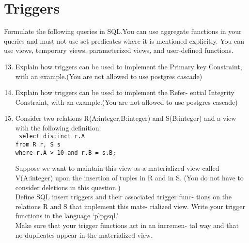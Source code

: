 \documentclass{article}
\begin{document}
\section{Triggers}
Formulate the following queries in SQL.You can use aggregate
functions in your queries and must not use set predicates where
it is mentioned explicitly. You can use views, temporary views,
parameterized views, and user-defined functions.
\begin{enumerate}
\setcounter{enumi}{12}
    \item Explain how triggers can be used to implement the Primary
key Constraint, with an example.(You are not allowed to
use postgres cascade)
\item Explain how triggers can be used to implement the Refer-
ential Integrity Constraint, with an example.(You are not
allowed to use postgres cascade)
\item Consider two relations R(A:integer,B:integer) and S(B:integer)
and a view with the following definition:\\
\texttt{
select distinct r.A\\
from R r, S s\\
where r.A > 10 and r.B = s.B;}

Suppose we want to maintain this view as a materialized
view called V(A:integer) upon the insertion of tuples in R
and in S. (You do not have to consider deletions in this
question.)\\
Define SQL insert triggers and their associated trigger func-
tions on the relations R and S that implement this mate-
rialized view. Write your trigger functions in the language
‘plpgsql.’\\
Make sure that your trigger functions act in an incremen-
tal way and that no duplicates appear in the materialized
view.
\end{enumerate}
\end{document}
